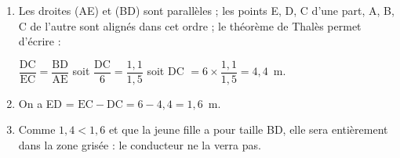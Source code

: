 \begin{enumerate}
\item %
Les droites (AE) et (BD) sont parallèles ; les points E, D, C d'une part, A, B, C de l'autre sont alignés dans cet ordre ; le théorème de Thalès permet d'écrire :

$\dfrac{\text{DC}}{\text{EC}} =  \dfrac{\text{BD}}{\text{AE}}$ soit $\dfrac{\text{DC}}{6} = \dfrac{1,1}{1,5}$ soit DC $ = 6\times \dfrac{1,1}{1,5} = 4,4$~m.
\item %
On a ED = $\text{EC} - \text{DC} = 6 - 4,4 = 1,6$~m. 
\item %

Comme $1,4 < 1,6$ et que la jeune fille a pour taille BD, elle sera entièrement dans la zone grisée  : le conducteur ne la verra pas.
\end{enumerate}
 
\bigskip 

